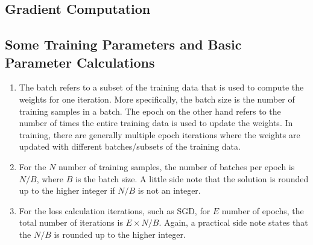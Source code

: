 \documentclass[3p,times,procedia]{elsarticle}
\begin{document}

\subsection{\textbf{Gradient Computation}}
\subsection{\textbf{Some Training Parameters and Basic Parameter Calculations}}
\begin{enumerate}
    \item The batch refers to a subset of the training data that is used to compute the weights for one iteration. More specifically, the batch size is the number of training samples in a batch.
 The epoch on the other hand refers to the number of times the entire training data is used to update the weights. In training, there are generally multiple epoch iterations where the weights are updated with different batches/subsets of the training data.
    \item For the $N$ number of training samples, the number of batches per epoch is $N/B$, where $B$ is the batch size. A little side note that the solution is rounded up to the higher integer if $N/B$ is not an integer.
    \item For the loss calculation iterations, such as SGD, for $E$ number of epochs, the total number of iterations is $E \times N/B$. Again, a practical side note states that the $N/B$ is rounded up to the higher integer.
\end{enumerate}
\end{document}
